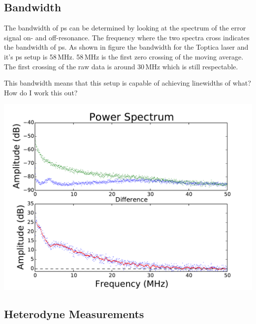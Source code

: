\documentclass{article}
\newenvironment{Figure}
  {\par\medskip\noindent\minipage{\linewidth}}
  {\endminipage\par\medskip}
\begin{document}
\begin{multicols}{2}
\subsection{Bandwidth}
The bandwidth of \gls{ps} can be determined by looking at the spectrum of the error signal on- and off-resonance. The frequency where the two spectra cross indicates the bandwidth of \gls{ps}. As shown in figure \label{bandwidth_measurement} the bandwidth for the Toptica laser and it's \gls{ps} setup is 58\,MHz. {\color{red} 58\,MHz is the first zero crossing of the moving average. The first crossing of the raw data is around 30\,MHz which is still respectable.}

{\color{red} This bandwidth means that this setup is capable of achieving linewidths of what? How do I work this out?}

\begin{Figure}
    \centering
    \captionsetup{type=figure}
    \includegraphics[width=\linewidth]{Figs/bandwidth.pdf}
    \label{bandwidth_measurement}
\end{Figure}

\subsection{Heterodyne Measurements}


\end{multicols}
\end{document}
